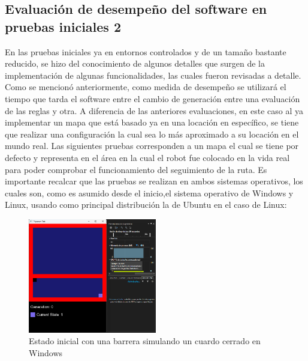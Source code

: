 \subsection{Evaluaci\'on de desempe\~no del software en pruebas iniciales 2}
    En las pruebas iniciales ya en entornos controlados y de un
        tama\~no bastante reducido, se hizo del conocimiento de
        algunos detalles que surgen de la implementaci\'on de algunas
        funcionalidades, las cuales fueron revisadas a detalle.
    \vskip 0.5cm
    Como se mencion\'o anteriormente, como medida de
        desempe\~no se utilizar\'a el tiempo que tarda el software entre
        el cambio de generaci\'on entre una evaluaci\'on de las reglas y
        otra. A diferencia de las anteriores evaluaciones, en este caso
        al ya implementar un mapa que est\'a basado ya en una
        locaci\'on en espec\'ifico, se tiene que realizar una
        configuraci\'on la cual sea lo m\'as aproximado a su locaci\'on
        en el mundo real.
    \vskip 0.5cm
    Las siguientes pruebas corresponden a un mapa el cual se
        tiene por defecto y representa en el \'area en la cual el robot
        fue colocado en la vida real para poder comprobar el
        funcionamiento del seguimiento de la ruta. Es importante
        recalcar que las pruebas se realizan en ambos sistemas
        operativos, los cuales son, como es asumido desde el inicio,el sistema operativo de Windows y Linux, usando como
        principal distribuci\'on la de Ubuntu en el caso de Linux:
    \vskip 0.5cm
    \begin{figure}[htbp]
        \centering
        \includegraphics[width=0.5\textwidth]{./images/Pruebas/simulador/image047.png}
        \caption{Estado inicial con una barrera simulando un cuardo cerrado en Windows}
        \label{fig:Ruta 47}
    \end{figure}
    \vskip 0.5cm
